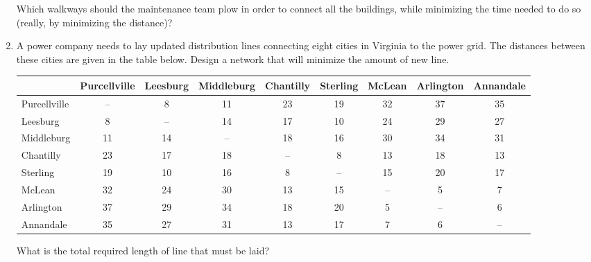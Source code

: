 \begin{enumerate}
\begin{center}
\end{center}
Which walkways should the maintenance team plow in order to connect all the buildings, while minimizing the time needed to do so (really, by minimizing the distance)?

\item A power company needs to lay updated distribution lines connecting eight cities in Virginia to the power grid.  The distances between these cities are given in the table below.  Design a network that will minimize the amount of new line.
\begin{center}
\begin{tabular}{l | c c c c c c c c}
& Purcellville & Leesburg & Middleburg & Chantilly & Sterling & McLean & Arlington & Annandale\\
\hline
Purcellville & -- & 8 & 11 & 23 & 19 & 32 & 37 & 35\\
Leesburg & 8 & -- & 14 & 17 & 10 & 24 & 29 & 27\\
Middleburg & 11 & 14 & -- & 18 & 16 & 30 & 34 & 31\\
Chantilly & 23 & 17 & 18 & -- & 8 & 13 & 18 & 13\\
Sterling & 19 & 10 & 16 & 8 & -- & 15 & 20 & 17\\
McLean & 32 & 24 & 30 & 13 & 15 & -- & 5 & 7\\
Arlington & 37 & 29 & 34 & 18 & 20 & 5 & -- & 6\\
Annandale & 35 & 27 & 31 & 13 & 17 & 7 & 6 & --
\end{tabular}
\end{center}
What is the total required length of line that must be laid?
\end{enumerate}